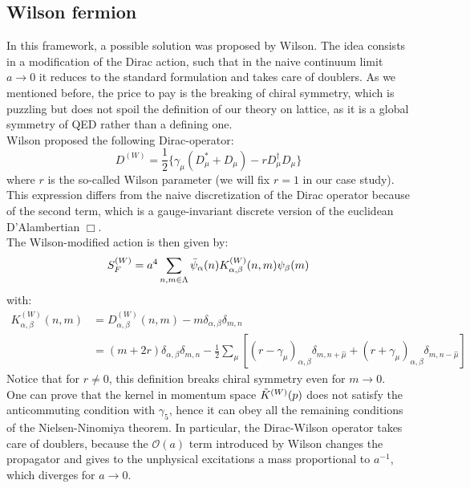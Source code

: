 \subsection{Wilson fermion}
In this framework, a possible solution was proposed by Wilson. The idea consists in a modification of the Dirac action, such that in the naive continuum limit $a \to 0$ it reduces to the standard formulation and takes care of doublers. As we mentioned before, the price to pay is the breaking of chiral symmetry, which is puzzling but does not spoil the definition of our theory on lattice, as it is a global symmetry of QED rather than a defining one. 
\\ Wilson proposed the following Dirac-operator:
\begin{equation}
    D^{(W)} = \frac{1}{2} \{ \gamma_\mu (D_\mu^* + D_\mu) - r D_\mu^\dagger D_\mu \}
\end{equation}
where $r$ is the so-called Wilson parameter (we will fix $r = 1$ in our case study). This expression differs from the naive discretization of the Dirac operator because of the second term, which is a gauge-invariant discrete version of the euclidean D'Alambertian $\Box$. \\ The Wilson-modified action is then given by:
\begin{equation}
    S_F^{(W)} = a^4 \sum_{n, m \in \Lambda} \Bar{\psi}_\alpha(n) K_{\alpha, \beta}^{(W)}(n, m) \psi_\beta(m)
\end{equation}
with:
\begin{equation}
\begin{split}
        K_{\alpha, \beta}^{(W)}(n, m) & = D^{(W)}_{\alpha, \beta}(n,m) - m \delta_{\alpha, \beta}\delta_{m,n} \\
         & = (m + 2r)\delta_{\alpha, \beta}\delta_{m,n} - \frac{1}{2}\sum_\mu \left[(r - \gamma_\mu)_{\alpha, \beta} \delta_{m, n+\hat{\mu}} + (r + \gamma_\mu)_{\alpha, \beta} \delta_{m, n - \hat{\mu}} \right]
\end{split}
\end{equation}
Notice that for $r \neq 0$, this definition breaks chiral symmetry even for $m \to 0$.
\\ One can prove that the kernel in momentum space $\Tilde{K}^{(W)}(p)$ does not satisfy the anticommuting condition with $\gamma_5$, hence it can obey all the remaining conditions of the Nielsen-Ninomiya theorem. 
In particular, the Dirac-Wilson operator takes care of doublers, because the $\mathcal{O}(a)$ term introduced by Wilson changes the propagator and gives to the unphysical excitations a mass proportional to $a^{-1}$, which diverges for $a \to 0$. 
